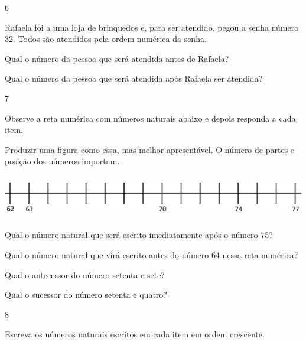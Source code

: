 \begin{escolha}
\num{6}

Rafaela foi a uma loja de brinquedos e, para ser atendido, pegou a senha
número 32. Todos são atendidos pela ordem numérica da senha.

\begin{escolha}

\item
  Qual o número da pessoa que será atendida antes de Rafaela?

\item
  Qual o número da pessoa que será atendida após Rafaela ser atendida?

\end{escolha}

\num{7}

Observe a reta numérica com números naturais abaixo e depois responda a
cada item.

Produzir uma figura como essa, mas melhor apresentável. O número de
partes e posição dos números importam.

\includegraphics[width=5.22545in,height=0.75840in]{media/image31.png}

\begin{escolha}

\item
  Qual o número natural que será escrito imediatamente após o número 75?

\item
  Qual o número natural que virá escrito antes do número 64 nessa reta
  numérica?

\item
  Qual o antecessor do número setenta e sete?

\item
  Qual o sucessor do número setenta e quatro?

\end{escolha}

\num{8}

Escreva os números naturais escritos em cada item em ordem crescente.


\end{escolha}
